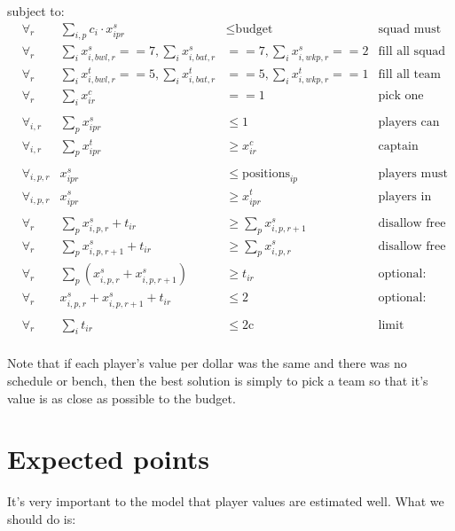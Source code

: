 \documentclass[10pt]{article}
\begin{document}
subject to:
\begin{align*}
    &\forall_{r} & \sum_{i,p} c_i \cdot x^s_{ipr} &\le \text{budget} &\text{squad must stay in budget}\\
    &\forall_{r} & \sum_{i} x^s_{i,bwl,r} == 7, \sum_{i} x^s_{i,bat,r} &== 7, \sum_{i} x^s_{i,wkp,r} == 2 &\text{fill all squad positions}\\
    &\forall_{r} & \sum_{i} x^t_{i,bwl,r} == 5, \sum_{i} x^t_{i,bat,r} &== 5, \sum_{i} x^t_{i,wkp,r} == 1 &\text{fill all team positions} \\
    &\forall_{r} & \sum_{i} x^c_{ir} &== 1 &\text{pick one captain}\\
    \\
    &\forall_{i,r} & \sum_{p} x^s_{ipr} &\le 1 &\text{players can only be picked in one position}\\
    &\forall_{i,r} & \sum_{p} x^t_{ipr} &\ge x^c_{ir} &\text{captain must also be in team}\\
    \\
    &\forall_{i,p,r} & x^s_{ipr} &\le \text{positions}_{ip} &\text{players must be available for position}\\
    &\forall_{i,p,r} & x^s_{ipr} &\ge x^t_{ipr} &\text{players in team must also be in squad}\\
    \\
    &\forall_{r} & \sum_{p} x^s_{i,p,r} + t_{ir} &\ge \sum_{p} x^s_{i,p,r+1} &\text{disallow free trade-in}\\
    &\forall_{r} & \sum_{p} x^s_{i,p,r+1} + t_{ir} &\ge \sum_{p} x^s_{i,p,r} &\text{disallow free trade-out}\\
    &\forall_{r} & \sum_{p} \left( x^s_{i,p,r} + x^s_{i,p,r+1} \right) &\ge t_{ir} &\text{optional: wasted trade (not picked)}\\
    &\forall_{r} & x^s_{i,p,r} + x^s_{i,p,r+1} + t_{ir} &\le 2  &\text{optional: wasted trade (picked) (check)}\\
    \\
    &\forall_{r} & \sum_{i} t_{ir} &\le 2\text{c} &\text{limit number of trades}\\
\end{align*}

Note that if each player's value per dollar was the same and there was no schedule or bench, then the best solution is simply to pick a team so that it's value is as close as possible to the budget.\\


\section{Expected points}
It's very important to the model that player values are estimated well. What we should do is:
\end{document}
